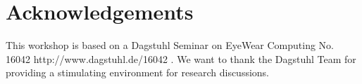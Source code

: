 \documentclass{sigchi-ext}
\begin{document}
\section{Acknowledgements}
This workshop is based on a Dagstuhl Seminar on EyeWear Computing No. 16042 http://www.dagstuhl.de/16042 . We want to thank the Dagstuhl Team for providing a stimulating environment for research discussions.

\balance{} 



\end{document}
